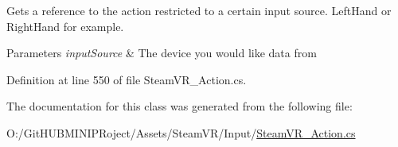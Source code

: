 Gets a reference to the action restricted to a certain input source. Left\+Hand or Right\+Hand for example. 


\begin{DoxyParams}{Parameters}
{\em input\+Source} & The device you would like data from\\
\hline
\end{DoxyParams}


Definition at line 550 of file Steam\+V\+R\+\_\+\+Action.\+cs.



The documentation for this class was generated from the following file\+:\begin{DoxyCompactItemize}
\item 
O\+:/\+Git\+H\+U\+B\+M\+I\+N\+I\+P\+Roject/\+Assets/\+Steam\+V\+R/\+Input/\mbox{\hyperlink{_steam_v_r___action_8cs}{Steam\+V\+R\+\_\+\+Action.\+cs}}\end{DoxyCompactItemize}
